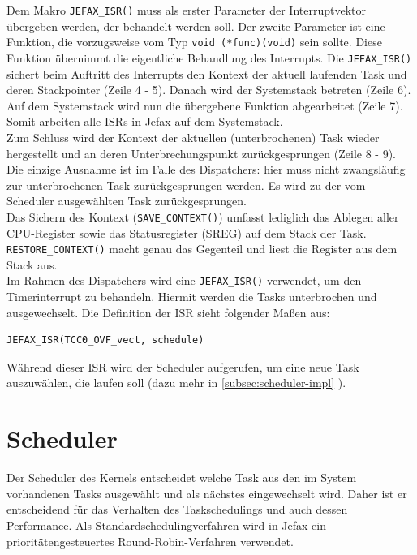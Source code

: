 \documentclass[fontsize=12pt, toc=bibliography, notitlepage]{scrreprt}
\newcommand{\refnn}[1]{\ref{#1} \nameref{#1}}
\begin{document}
Dem Makro \lstinline$JEFAX_ISR()$ muss als erster Parameter der Interruptvektor übergeben werden, der behandelt werden soll. Der zweite Parameter ist eine Funktion, die vorzugsweise vom Typ \lstinline$void (*func)(void)$ sein sollte. Diese Funktion übernimmt die eigentliche Behandlung des Interrupts. Die \lstinline$JEFAX_ISR()$ sichert beim Auftritt des Interrupts den Kontext der aktuell laufenden Task und deren Stackpointer (Zeile 4 - 5). Danach wird der Systemstack betreten (Zeile 6). Auf dem Systemstack wird nun die übergebene Funktion abgearbeitet (Zeile 7). Somit arbeiten alle ISRs in Jefax auf dem Systemstack.\\
Zum Schluss wird der Kontext der aktuellen (unterbrochenen) Task wieder hergestellt und an deren Unterbrechungspunkt zurückgesprungen (Zeile 8 - 9). Die einzige Ausnahme ist im Falle des Dispatchers: hier muss nicht zwangsläufig zur unterbrochenen Task zurückgesprungen werden. Es wird zu der vom Scheduler ausgewählten Task zurückgesprungen.\\
Das Sichern des Kontext (\lstinline$SAVE_CONTEXT()$) umfasst lediglich das Ablegen aller CPU-Register sowie das Statusregister (SREG) auf dem Stack der Task. \lstinline$RESTORE_CONTEXT()$ macht genau das Gegenteil und liest die Register aus dem Stack aus.\\
Im Rahmen des Dispatchers wird eine \lstinline$JEFAX_ISR()$ verwendet, um den Timerinterrupt zu behandeln. Hiermit werden die Tasks unterbrochen und ausgewechselt. Die Definition der ISR sieht folgender Maßen aus:

\begin{lstlisting}[title=dispatcher.c]
JEFAX_ISR(TCC0_OVF_vect, schedule)
\end{lstlisting}

Während dieser ISR wird der Scheduler aufgerufen, um eine neue Task auszuwählen, die laufen soll (dazu mehr in \refnn{subsec:scheduler-impl}).

\newpage

\section{Scheduler}
\label{sec:scheduler}
Der Scheduler des Kernels entscheidet welche Task aus den im System vorhandenen Tasks ausgewählt und als nächstes eingewechselt wird. Daher ist er entscheidend für das Verhalten des Taskschedulings und auch dessen Performance. Als Standardschedulingverfahren wird in Jefax ein prioritätengesteuertes Round-Robin-Verfahren verwendet.
\end{document}

